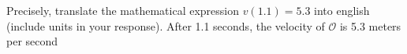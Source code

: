 {Precisely, translate the mathematical expression $v(1.1)=5.3$ into english (include units in your response).}
{After 1.1 seconds, the velocity of $\mathcal{O}$ is 5.3 meters per second}